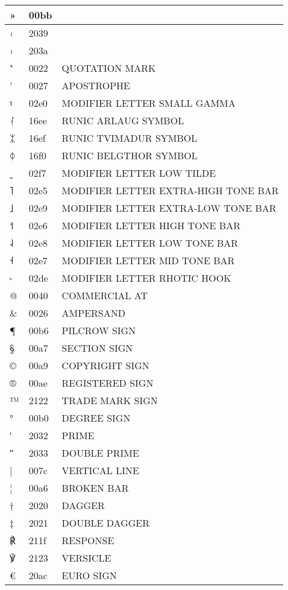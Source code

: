 \documentclass[12pt,letterpaper,openany]{book}
\begin{document}
\begin{center}
\begin{supertabular}{|m{0.25in}|m{0.5in}|m{4in}|}
» & 00bb & \\\hline
‹ & 2039 & \\\hline
› & 203a & \\\hline
" & 0022 & QUOTATION MARK\\\hline
' & 0027 & APOSTROPHE\\\hline
ˠ & 02e0 & MODIFIER LETTER SMALL GAMMA\\\hline
ᛮ & 16ee & RUNIC ARLAUG SYMBOL\\\hline
ᛯ & 16ef & RUNIC TVIMADUR SYMBOL\\\hline
ᛰ & 16f0 & RUNIC BELGTHOR SYMBOL\\\hline
˷ & 02f7 & MODIFIER LETTER LOW TILDE\\\hline
˥ & 02e5 & MODIFIER LETTER EXTRA-HIGH TONE BAR\\\hline
˩ & 02e9 & MODIFIER LETTER EXTRA-LOW TONE BAR\\\hline
˦ & 02e6 & MODIFIER LETTER HIGH TONE BAR\\\hline
˨ & 02e8 & MODIFIER LETTER LOW TONE BAR\\\hline
˧ & 02e7 & MODIFIER LETTER MID TONE BAR\\\hline
˞ & 02de & MODIFIER LETTER RHOTIC HOOK\\\hline
@ & 0040 & COMMERCIAL AT\\\hline
\& & 0026 & AMPERSAND\\\hline
¶ & 00b6 & PILCROW SIGN\\\hline
§ & 00a7 & SECTION SIGN\\\hline
© & 00a9 & COPYRIGHT SIGN\\\hline
® & 00ae & REGISTERED SIGN\\\hline
™ & 2122 & TRADE MARK SIGN\\\hline
° & 00b0 & DEGREE SIGN\\\hline
′ & 2032 & PRIME\\\hline
″ & 2033 & DOUBLE PRIME\\\hline
| & 007c & VERTICAL LINE\\\hline
¦ & 00a6 & BROKEN BAR\\\hline
† & 2020 & DAGGER\\\hline
‡ & 2021 & DOUBLE DAGGER\\\hline
℟ & 211f & RESPONSE\\\hline
℣ & 2123 & VERSICLE\\\hline
€ & 20ac & EURO SIGN\\\hline

\end{supertabular}
\end{center}
\end{document}
